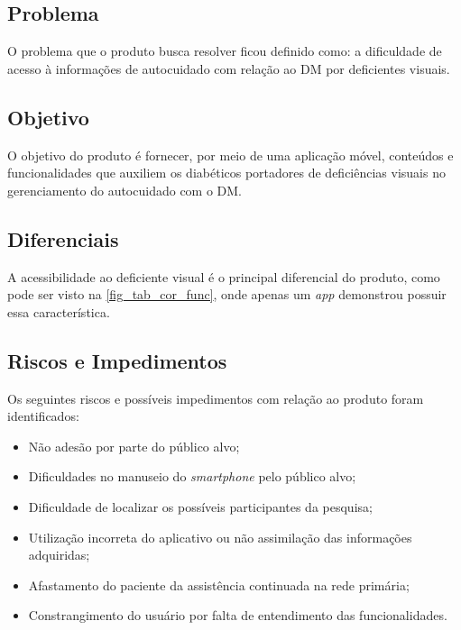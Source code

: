 \subsection{Problema}

O problema que o produto busca resolver ficou definido como: a dificuldade de acesso à informações de autocuidado com relação
ao DM por deficientes visuais.

\subsection{Objetivo}

O objetivo do produto é fornecer, por meio de uma aplicação móvel, conteúdos e funcionalidades que auxiliem os diabéticos portadores de deficiências
visuais no gerenciamento do autocuidado com o DM\@.

\subsection{Diferenciais}

A acessibilidade ao deficiente visual é o principal diferencial do produto, como pode ser visto na \autoref{fig_tab_cor_func},
onde apenas um \emph{app} demonstrou possuir essa característica.

\subsection{Riscos e Impedimentos}

Os seguintes riscos e possíveis impedimentos com relação ao produto foram identificados:

\begin{itemize}
    \item Não adesão por parte do público alvo;
    \item Dificuldades no manuseio do \emph{smartphone} pelo público alvo;
    \item Dificuldade de localizar os possíveis participantes da pesquisa;
    \item Utilização incorreta do aplicativo ou não assimilação das informações adquiridas;
    \item Afastamento do paciente da assistência continuada na rede primária;
    \item Constrangimento do usuário por falta de entendimento das funcionalidades.
\end{itemize}

\newpage

